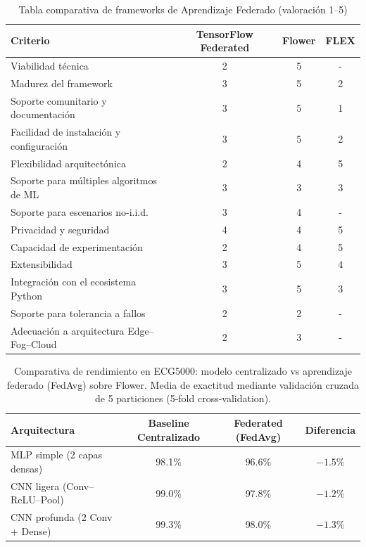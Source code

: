 \documentclass{report}
\begin{document}
\begin{table}[H]
\centering
\footnotesize
\caption{Tabla comparativa de frameworks de Aprendizaje Federado (valoración 1--5)}
\label{tab:comparativa-frameworks}

\renewcommand{\arraystretch}{1.25}
\setlength{\tabcolsep}{4pt}

\begin{tabular}{@{} l c c c @{}}  
\toprule
\textbf{Criterio} 
& \textbf{TensorFlow Federated} 
& \textbf{Flower} 
& \textbf{FLEX} \\
\midrule
Viabilidad técnica & 2 & 5 & - \\
Madurez del framework & 3 & 5 & 2 \\
Soporte comunitario y documentación & 3 & 5 & 1 \\
Facilidad de instalación y configuración & 3 & 5 & 2 \\
Flexibilidad arquitectónica & 2 & 4 & 5 \\
Soporte para múltiples algoritmos de ML & 3 & 3 & 3 \\
Soporte para escenarios no-i.i.d. & 3 & 4 & - \\
Privacidad y seguridad & 4 & 4 & 5 \\
Capacidad de experimentación & 2 & 4 & 5 \\
Extensibilidad & 3 & 5 & 4 \\
Integración con el ecosistema Python & 3 & 5 & 3 \\
Soporte para tolerancia a fallos & 2 & 2 & - \\
Adecuación a arquitectura Edge--Fog--Cloud & 2 & 3 & - \\
\bottomrule
\end{tabular}
\end{table}


\begin{table}[H]
\centering
\footnotesize
\caption{Comparativa de rendimiento en ECG5000: modelo centralizado vs aprendizaje federado (FedAvg) sobre Flower. Media de exactitud mediante validación cruzada de 5 particiones (5-fold cross-validation).}
\label{tab:ECG5000-baseline-vs-fedavg}

\renewcommand{\arraystretch}{1.25}
\setlength{\tabcolsep}{4pt}

\begin{tabular}{@{} l c c c @{}}  
\toprule
\textbf{Arquitectura} 
& \textbf{Baseline Centralizado} 
& \textbf{Federated (FedAvg)} 
& \textbf{Diferencia} \\
\midrule
MLP simple (2 capas densas) & 98.1\% & 96.6\% & $-1.5\%$ \\
CNN ligera (Conv--ReLU--Pool) & 99.0\% & 97.8\% & $-1.2\%$ \\
CNN profunda (2 Conv + Dense) & 99.3\% & 98.0\% & $-1.3\%$ \\
\bottomrule
\end{tabular}
\end{table}
\end{document}
